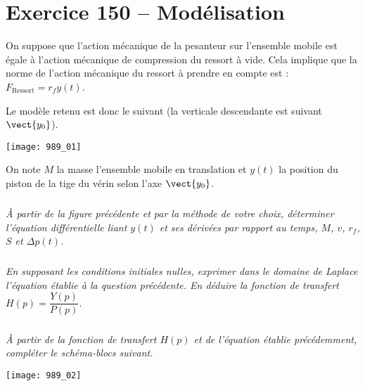 \section*{Exercice 150 -- Modélisation}
\setcounter{exo}{0}


On suppose que l’action mécanique de la pesanteur sur l’ensemble mobile est égale à
l’action mécanique de compression du ressort à vide. Cela implique que la norme de l’action
mécanique du ressort à prendre en compte est : $F_{\text{Ressort}} = r_f y(t)$.

Le modèle retenu est donc le suivant (la verticale descendante est suivant $\vect{y_0}$).


\begin{center}
\texttt{[image: 989\_01]}%
\end{center}

On note $M$ la masse l’ensemble mobile en translation et $y(t)$ la position du piston de la tige du vérin selon l’axe $\vect{y_0}$.




\subparagraph{}
 \textit{À partir de la figure précédente et par la méthode de votre choix, déterminer
l'équation différentielle liant $y(t)$ et ses dérivées par rapport au temps, $M$, $v$, $r_f$, $S$ et $\Delta p(t)$.}
\ifprof
\begin{corrige}
\end{corrige}
\else
\fi

\subparagraph{}
\textit{En supposant les conditions initiales nulles, exprimer dans le domaine de Laplace
l’équation établie à la question précédente. En déduire la fonction de transfert $H(p) = \dfrac{Y(p)}{P(p)}$.}
\ifprof
\begin{corrige}
\end{corrige}
\else
\fi

\subparagraph{}
 \textit{À partir de la fonction de transfert $H(p)$ et de l’équation établie précédemment, compléter le schéma-blocs suivant.}
\ifprof
\begin{corrige}
\end{corrige}
\else
\fi


\begin{center}
\texttt{[image: 989\_02]}%
\end{center}

